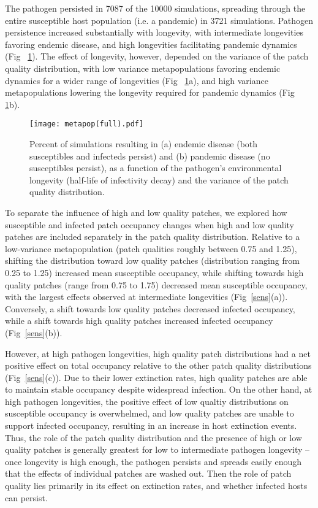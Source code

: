 \documentclass{svjour3}
\begin{document}
The pathogen persisted in 7087 of the 10000 simulations, spreading through the entire susceptible host population (i.e. a pandemic) in 3721 simulations.  Pathogen persistence increased substantially with longevity, with intermediate longevities favoring endemic disease, and high longevities facilitating pandemic dynamics (Fig~ \ref{poutcome}).  The effect of longevity, however, depended on the variance of the patch quality distribution, with low variance metapopulations favoring endemic dynamics for a wider range of longevities (Fig~ \ref{poutcome}a), and high variance metapopulations lowering the longevity required for pandemic dynamics (Fig~ \ref{poutcome}b).

\begin{figure}
\centering
\texttt{[image: metapop(full).pdf]}
\caption{Percent of simulations resulting in (a) endemic disease (both susceptibles and infecteds persist) and (b) pandemic disease (no susceptibles persist), as a function of the pathogen's environmental longevity (half-life of infectivity decay) and the variance of the patch quality distribution.}
\label{poutcome}
\end{figure}   

To separate the influence of high and low quality patches, we explored how susceptible and infected patch occupancy changes when high and low quality patches are included separately in the patch quality distribution.  Relative to a low-variance metapopulation (patch qualities roughly between 0.75 and 1.25), shifting the distribution toward low quality patches (distribution ranging from 0.25 to 1.25) increased mean susceptible occupancy, while shifting towards high quality patches (range from 0.75 to 1.75) decreased mean susceptible occupancy, with the largest effects observed at intermediate longevities (Fig~\ref{sens}(a)).  Conversely, a shift towards low quality patches decreased infected occupancy, while a shift towards high quality patches increased infected occupancy (Fig~\ref{sens}(b)).  

However, at high pathogen longevities, high quality patch distributions had a net positive effect on total occupancy relative to the other patch quality distributions (Fig~\ref{sens}(c)).  Due to their lower extinction rates, high quality patches are able to maintain stable occupancy despite widespread infection.  On the other hand, at high pathogen longevities, the positive effect of low qualtiy distributions on susceptible occupancy is overwhelmed, and low quality patches are unable to support infected occupancy, resulting in an increase in host extinction events.  Thus, the role of the patch quality distribution and the presence of high or low quality patches is generally greatest for low to intermediate pathogen longevity -- once longevity is high enough, the pathogen persists and spreads easily enough that the effects of individual patches are washed out.  Then the role of patch quality lies primarily in its effect on extinction rates, and whether infected hosts can persist.
\end{document}
